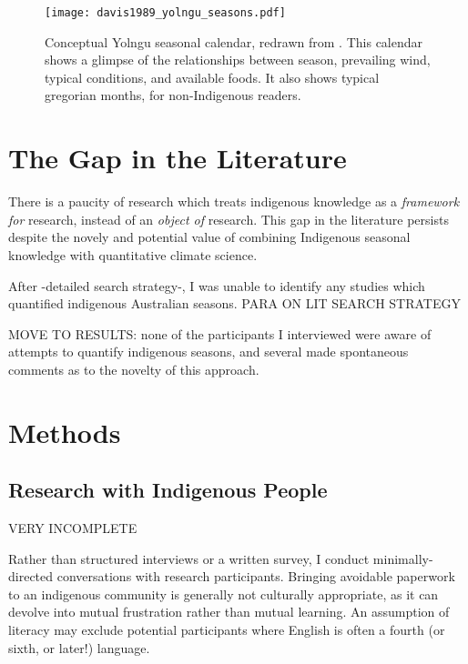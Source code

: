 \begin{figure}[h]
    \centering
    \texttt{[image: davis1989\_yolngu\_seasons.pdf]}
    \caption[Conceptual Yolngu seasonal calendar \citep{davis1989}]{
        Conceptual Yolngu seasonal calendar, redrawn from \citet[p2]{davis1989}.
        This calendar shows a glimpse of the relationships between season,
        prevailing wind, typical conditions, and available foods.
        It also shows typical gregorian months, for non-Indigenous readers.
        }
    \label{fig:yolngu-seasons}
\end{figure}




\section{The Gap in the Literature}

There is a paucity of research which treats indigenous knowledge
as a \emph{framework for} research, instead of an \emph{object of} research.
This gap in the literature persists despite the novely and potential value
of combining Indigenous seasonal knowledge with quantitative climate science.

After -detailed search strategy-, I was unable to identify any studies which
quantified indigenous Australian seasons.  PARA ON LIT SEARCH STRATEGY


MOVE TO RESULTS: none of the participants I interviewed were aware of
attempts to quantify indigenous seasons, and several made spontaneous
comments as to the novelty of this approach.



\section{Methods}


\subsection{Research with Indigenous People}

VERY INCOMPLETE

Rather than structured interviews or a written survey, I conduct minimally-
directed conversations with research participants.  Bringing avoidable
paperwork to an indigenous community is generally not culturally appropriate,
as it can devolve into mutual frustration rather than mutual learning.  An
assumption of literacy may exclude potential participants where English is
often a fourth (or sixth, or later!) language.

